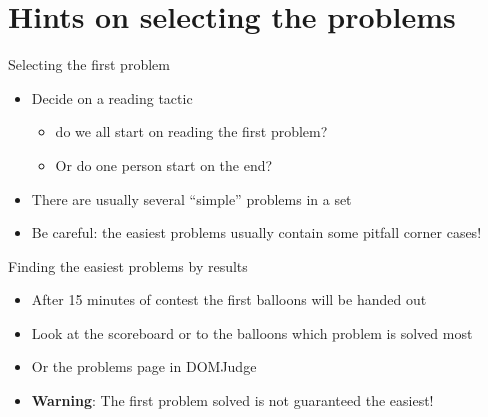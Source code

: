 \documentclass[11pt,pdf, aspectratio=169]{beamer}
\begin{document}
  \section{Hints on selecting the problems}
  \begin{frame}{Selecting the first problem}
    \begin{itemize}
      \item Decide on a reading tactic
      \begin{itemize}
        \item do we all start on reading the first problem?
        \item Or do one person start on the end?
      \end{itemize}
      \item There are usually several ``simple'' problems in a set
      \item Be careful: the easiest problems usually contain some pitfall corner cases!
    \end{itemize}
  \end{frame}
  \begin{frame}{Finding the easiest problems by results}
    \begin{itemize}
      \item After 15 minutes of contest the first balloons will be handed out
      \item Look at the scoreboard or to the balloons which problem is solved most %
      \item Or the problems page in DOMJudge %
      \item \textbf{Warning}: The first problem solved is not guaranteed the easiest!
    \end{itemize}
  \end{frame}
\end{document}
